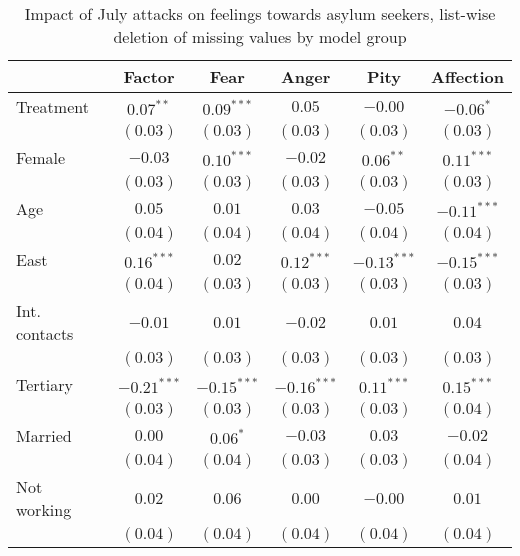 
\begin{table}
\caption{Impact of July attacks on feelings towards asylum seekers, list-wise deletion of missing values by model group}
\begin{center}
\begin{tabular}{l c c c c c}
\toprule
 & Factor & Fear & Anger & Pity & Affection \\
\midrule
Treatment     & $0.07^{**}$   & $0.09^{***}$  & $0.05$        & $-0.00$       & $-0.06^{*}$   \\
              & $(0.03)$      & $(0.03)$      & $(0.03)$      & $(0.03)$      & $(0.03)$      \\
Female        & $-0.03$       & $0.10^{***}$  & $-0.02$       & $0.06^{**}$   & $0.11^{***}$  \\
              & $(0.03)$      & $(0.03)$      & $(0.03)$      & $(0.03)$      & $(0.03)$      \\
Age           & $0.05$        & $0.01$        & $0.03$        & $-0.05$       & $-0.11^{***}$ \\
              & $(0.04)$      & $(0.04)$      & $(0.04)$      & $(0.04)$      & $(0.04)$      \\
East          & $0.16^{***}$  & $0.02$        & $0.12^{***}$  & $-0.13^{***}$ & $-0.15^{***}$ \\
              & $(0.04)$      & $(0.03)$      & $(0.03)$      & $(0.03)$      & $(0.03)$      \\
Int. contacts & $-0.01$       & $0.01$        & $-0.02$       & $0.01$        & $0.04$        \\
              & $(0.03)$      & $(0.03)$      & $(0.03)$      & $(0.03)$      & $(0.03)$      \\
Tertiary      & $-0.21^{***}$ & $-0.15^{***}$ & $-0.16^{***}$ & $0.11^{***}$  & $0.15^{***}$  \\
              & $(0.03)$      & $(0.03)$      & $(0.03)$      & $(0.03)$      & $(0.04)$      \\
Married       & $0.00$        & $0.06^{*}$    & $-0.03$       & $0.03$        & $-0.02$       \\
              & $(0.04)$      & $(0.04)$      & $(0.03)$      & $(0.03)$      & $(0.04)$      \\
Not working   & $0.02$        & $0.06$        & $0.00$        & $-0.00$       & $0.01$        \\
              & $(0.04)$      & $(0.04)$      & $(0.04)$      & $(0.04)$      & $(0.04)$      \\
\midrule

\end{tabular}
\end{center}
\end{table}

